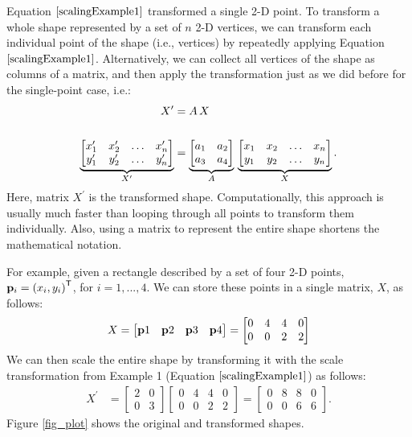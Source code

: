 \documentclass[12pt,letter]{article}
\begin{document}
Equation \(\ref{scalingExample1}\) transformed a single 2-D point. To
transform a whole shape represented by a set of \(n\) 2-D vertices, we can transform each individual point of the shape (i.e., vertices) by repeatedly applying Equation \(\ref{scalingExample1}\). Alternatively, we 
can collect all vertices of the shape as columns of a matrix, and then
apply the transformation just as we did before for the single-point
case, i.e.:
\begin{align}
	X^\prime &= A\,X \\\notag\\
  \underbrace{\begin{bmatrix}    
  x_1^\prime & x_2^\prime & \hdots &x_n^\prime\\    
  y_1^\prime & y_2^\prime & \hdots &y_n^\prime  
  \end{bmatrix}}_{X^\prime}   	&=
	\underbrace{\begin{bmatrix}
		a_1 & a_2 \\
		a_3 & a_4
	\end{bmatrix}}_{A}\,
	\underbrace{\begin{bmatrix}
		x_1 & x_2 & \hdots &x_n\\
		y_1 & y_2 & \hdots &y_n
	\end{bmatrix}}_{X}.	
\end{align}
Here, matrix \(X^\prime\) is the transformed shape. Computationally, this approach is usually much faster than looping through all points to transform them individually. Also, using a matrix to represent the entire shape shortens the mathematical notation. 

For example, given a rectangle described by a set of four 2-D points,
\({\bf p}_i =
\left( x_i, y_i\right)^\mathsf{T}\), for \(i=1,..., 4\). We can store
these points in a single matrix, \(X\), as follows:
\begin{align} 
  X = 
  \begin{bmatrix}
      {\bf p}1 & {\bf p}2 & {\bf p}3 &{\bf p}4 
  \end{bmatrix} 
  = 
\begin{bmatrix} 
	 0 & 4 & 4 & 0\\
		0 & 0 & 2 & 2  
\end{bmatrix}   
\end{align}
We can then scale the entire shape by transforming it with the scale
transformation from Example 1 (Equation \(\ref{scalingExample1}\)) as
follows:
\begin{align}
 X^\prime
 	&=
	\begin{bmatrix}
		2 & 0 \\
		0 & 3
	\end{bmatrix}
	 \begin{bmatrix}      
	 0 & 4 & 4 & 0\\ 
	 0 & 0 & 2 & 2  
	 \end{bmatrix} 
 	=
	\begin{bmatrix}
	 0 & 8 & 8 & 0\\    
	 0 & 0 & 6 & 6  
	\end{bmatrix}. 
	\label{scalingExample3}
\end{align}
Figure \ref{fig_plot} shows the original and transformed shapes. 
\end{document}

